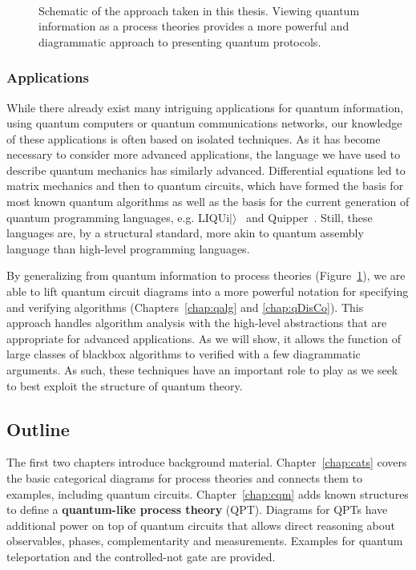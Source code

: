 \begin{figure}[t]
\begin{align*}

\end{align*}
\caption[Schematic of process theories and categorical diagrams.]{Schematic of the approach taken in this thesis. Viewing quantum information as a process theories provides a more powerful and diagrammatic approach to presenting quantum protocols.}
\label{fig:overview}
\end{figure}


\subsubsection*{Applications} While there already exist many intriguing applications for quantum information, using quantum computers or quantum communications networks, our knowledge of these applications is often based on isolated techniques. As it has become necessary to consider more advanced applications, the language we have used to describe quantum mechanics has similarly advanced. Differential equations led to matrix mechanics and then to quantum circuits, which have formed the basis for most known quantum algorithms as well as the basis for the current generation of quantum programming languages, e.g. LIQUi$|\rangle$~\cite{wecker2014liqui} and Quipper~\cite{green2013quipper}. Still, these languages are, by a structural standard, more akin to quantum assembly language than high-level programming languages. 

By generalizing from quantum information to process theories (Figure~\ref{fig:overview}), we are able to lift quantum circuit diagrams into a more powerful notation for specifying and verifying algorithms (Chapters~\ref{chap:qalg} and \ref{chap:qDisCo}). This approach handles algorithm analysis with the high-level abstractions that are appropriate for advanced applications. As we will show, it allows the function of large classes of blackbox algorithms to verified with a few diagrammatic arguments. As such, these techniques have an important role to play as we seek to best exploit the structure of quantum theory. 

\subsection*{Outline}

The first two chapters introduce background material. Chapter~\ref{chap:cats} covers the basic categorical diagrams for process theories and connects them to examples, including quantum circuits. Chapter~\ref{chap:cqm} adds known structures to define a \textbf{quantum-like process theory} (QPT). Diagrams for QPTs have additional power on top of quantum circuits that allows direct reasoning about observables, phases, complementarity and measurements. Examples for quantum teleportation and the controlled-not gate are provided.

